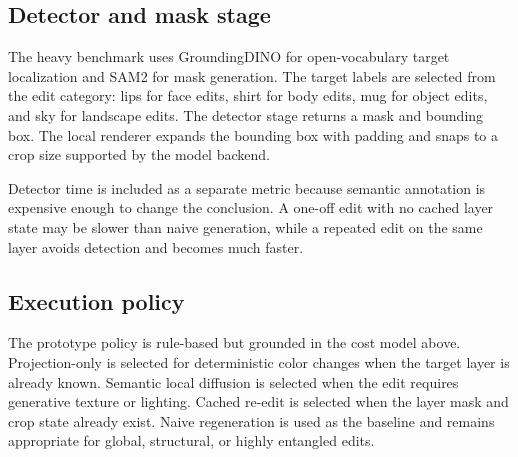 \documentclass[final,5p,times,number,sort&compress]{elsarticle}
\begin{document}
\subsection{Detector and mask stage}

The heavy benchmark uses GroundingDINO for open-vocabulary target localization and SAM2 for mask generation. The target labels are selected from the edit category: lips for face edits, shirt for body edits, mug for object edits, and sky for landscape edits. The detector stage returns a mask and bounding box. The local renderer expands the bounding box with padding and snaps to a crop size supported by the model backend.

Detector time is included as a separate metric because semantic annotation is expensive enough to change the conclusion. A one-off edit with no cached layer state may be slower than naive generation, while a repeated edit on the same layer avoids detection and becomes much faster.

\subsection{Execution policy}

The prototype policy is rule-based but grounded in the cost model above. Projection-only is selected for deterministic color changes when the target layer is already known. Semantic local diffusion is selected when the edit requires generative texture or lighting. Cached re-edit is selected when the layer mask and crop state already exist. Naive regeneration is used as the baseline and remains appropriate for global, structural, or highly entangled edits.
\end{document}
